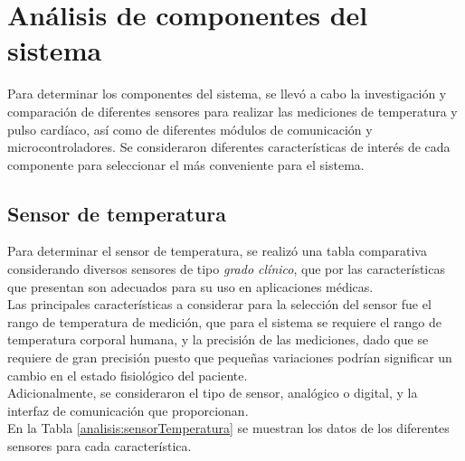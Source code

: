 
\section{Análisis de componentes del sistema}
Para determinar los componentes del sistema, se llevó a cabo la investigación y comparación de diferentes sensores para realizar las mediciones de temperatura y pulso cardíaco, así como de diferentes módulos de comunicación y microcontroladores. Se consideraron diferentes características de interés de cada componente para seleccionar el más conveniente para el sistema.


\subsection{Sensor de temperatura}
Para determinar el sensor de temperatura, se realizó una tabla comparativa considerando diversos sensores de tipo \textit{grado clínico}, que por las características que presentan son adecuados para su uso en aplicaciones médicas. \\

Las principales características a considerar para la selección del sensor fue el rango de temperatura de medición, que para el sistema se requiere el rango de temperatura corporal humana, y la precisión de las mediciones, dado que se requiere de gran precisión puesto que pequeñas variaciones podrían significar un cambio en el estado fisiológico del paciente.\\

Adicionalmente, se consideraron el tipo de sensor, analógico o digital, y la interfaz de comunicación que proporcionan.\\

En la Tabla \ref{analisis:sensorTemperatura} se muestran los datos de los diferentes sensores para cada característica. \\



